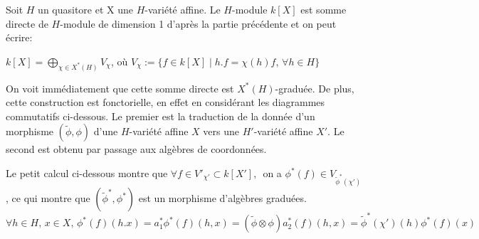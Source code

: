 \begin{cons}
Soit $H$ un quasitore et X une $H$-variété affine. Le $H$-module $k[X]$ est somme directe de $H$-module de dimension 1 d'après la partie précédente et on peut écrire: 
\begin{center}
$k[X]=\bigoplus_{\chi \in X^*(H)}V_\chi$,  où $V_\chi:=\lbrace f\in k[X]\mid h.f=\chi(h)f,\, \forall h\in H \rbrace$ 
\end{center}
On voit immédiatement que cette somme directe est $X^*(H)$-graduée. De plus, cette construction est fonctorielle, en effet en considérant les diagrammes commutatifs ci-dessous. Le premier est la traduction de la donnée d'un morphisme $(\widetilde{\phi},\phi)$ d'une $H$-variété affine $X$ vers une $H'$-variété affine $X'$. Le second est obtenu par passage aux algèbres de coordonnées.
\begin{multicols}{2}
	\begin{center}
	\end{center}

	\columnbreak
	\begin{center}
	\end{center}
\end{multicols}
Le petit calcul ci-dessous montre que $\forall f\in V'_{\chi'}\subset k[X'],\,$ on a $\phi^*(f)\in V_{\widetilde{\phi}^*(\chi')}$, ce qui montre que $(\widetilde{\phi}^*,\phi^*)$ est un morphisme d'algèbres graduées. 
$$\forall h\in H,\,x\in X,\, \phi^*(f)(h.x)=a_1^*\phi^*(f)(h, x)=(\widetilde{\phi}\otimes\phi)a_2^*(f)(h,x)=\widetilde{\phi}^*(\chi')(h)\phi^*(f)(x)$$ 

\end{cons}

